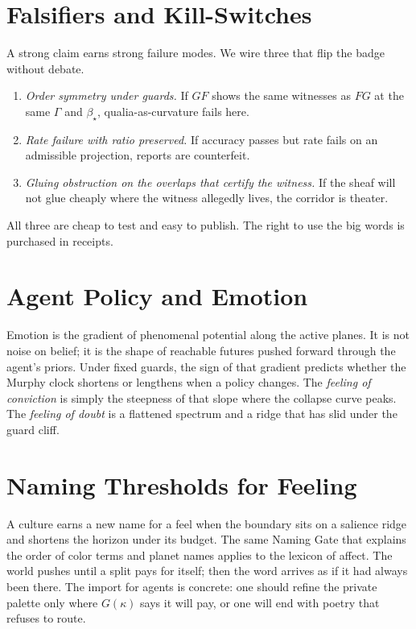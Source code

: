 \documentclass[11pt]{article}
\newcommand{\1}{\mathbf{1}}
\newcommand{\Guard}{\Gamma}
\newcommand{\Blur}{\beta}
\begin{document}
\section{Falsifiers and Kill-Switches}
A strong claim earns strong failure modes. We wire three that flip the badge without debate.
\begin{enumerate}[label=\textbf{KS\arabic*}.]
\item \emph{Order symmetry under guards.} If $GF$ shows the same witnesses as $FG$ at the same $\Guard$ and $\Blur_\star$, qualia-as-curvature fails here.
\item \emph{Rate failure with ratio preserved.} If accuracy passes but rate fails on an admissible projection, reports are counterfeit.
\item \emph{Gluing obstruction on the overlaps that certify the witness.} If the sheaf will not glue cheaply where the witness allegedly lives, the corridor is theater.
\end{enumerate}
All three are cheap to test and easy to publish. The right to use the big words is purchased in receipts.

\section{Agent Policy and Emotion}
Emotion is the gradient of phenomenal potential along the active planes. It is not noise on belief; it is the shape of reachable futures pushed forward through the agent's priors. Under fixed guards, the sign of that gradient predicts whether the Murphy clock shortens or lengthens when a policy changes. The \emph{feeling of conviction} is simply the steepness of that slope where the collapse curve peaks. The \emph{feeling of doubt} is a flattened spectrum and a ridge that has slid under the guard cliff.

\section{Naming Thresholds for Feeling}
A culture earns a new name for a feel when the boundary sits on a salience ridge and shortens the horizon under its budget. The same Naming Gate that explains the order of color terms and planet names applies to the lexicon of affect. The world pushes until a split pays for itself; then the word arrives as if it had always been there. The import for agents is concrete: one should refine the private palette only where $G(\kappa)$ says it will pay, or one will end with poetry that refuses to route.
\end{document}
